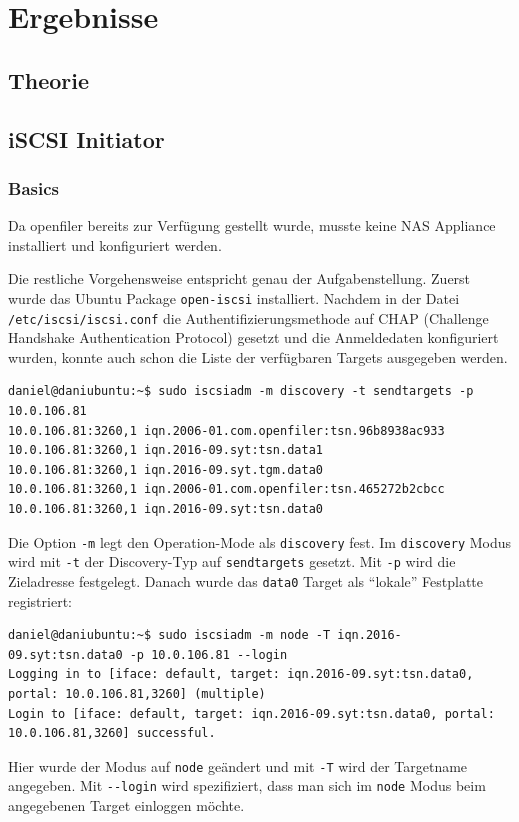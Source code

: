 
\section{Ergebnisse}
\subsection{Theorie}
\subsection{iSCSI Initiator}
\subsubsection{Basics}
Da openfiler bereits zur Verfügung gestellt wurde, musste keine NAS Appliance installiert und konfiguriert werden.

Die restliche Vorgehensweise entspricht genau der Aufgabenstellung. Zuerst wurde das Ubuntu Package \texttt{open-iscsi} installiert. Nachdem in der Datei \texttt{/etc/iscsi/iscsi.conf} die Authentifizierungsmethode auf CHAP (Challenge Handshake Authentication Protocol) gesetzt und die Anmeldedaten konfiguriert wurden, konnte auch schon die Liste der verfügbaren Targets ausgegeben werden.

\begin{lstlisting}[style=bash, caption=Verfügbare Targets]
daniel@daniubuntu:~$ sudo iscsiadm -m discovery -t sendtargets -p 10.0.106.81
10.0.106.81:3260,1 iqn.2006-01.com.openfiler:tsn.96b8938ac933
10.0.106.81:3260,1 iqn.2016-09.syt:tsn.data1
10.0.106.81:3260,1 iqn.2016-09.syt.tgm.data0
10.0.106.81:3260,1 iqn.2006-01.com.openfiler:tsn.465272b2cbcc
10.0.106.81:3260,1 iqn.2016-09.syt:tsn.data0
\end{lstlisting}
Die Option \texttt{-m} legt den Operation-Mode als \texttt{discovery} fest. Im \texttt{discovery} Modus wird mit \texttt{-t} der Discovery-Typ auf \texttt{sendtargets} gesetzt. Mit \texttt{-p} wird die Zieladresse festgelegt.
Danach wurde das \texttt{data0} Target als ``lokale'' Festplatte registriert:
\begin{lstlisting}[style=bash, caption=Target ``lokal'' registrieren]
daniel@daniubuntu:~$ sudo iscsiadm -m node -T iqn.2016-09.syt:tsn.data0 -p 10.0.106.81 --login
Logging in to [iface: default, target: iqn.2016-09.syt:tsn.data0, portal: 10.0.106.81,3260] (multiple)
Login to [iface: default, target: iqn.2016-09.syt:tsn.data0, portal: 10.0.106.81,3260] successful.
\end{lstlisting}
Hier wurde der Modus auf \texttt{node} geändert und mit \texttt{-T} wird der Targetname angegeben. Mit \texttt{-{}-login} wird spezifiziert, dass man sich im \texttt{node} Modus beim angegebenen Target einloggen möchte.

